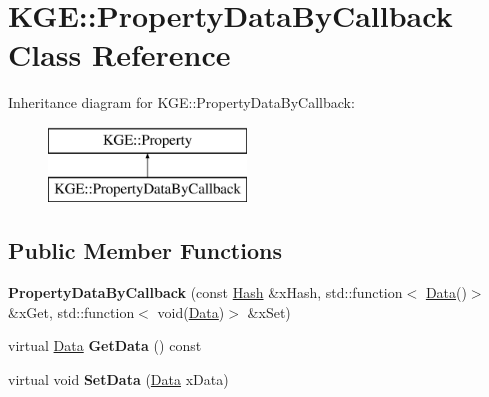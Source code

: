 \hypertarget{class_k_g_e_1_1_property_data_by_callback}{\section{K\-G\-E\-:\-:Property\-Data\-By\-Callback Class Reference}
\label{class_k_g_e_1_1_property_data_by_callback}
}
Inheritance diagram for K\-G\-E\-:\-:Property\-Data\-By\-Callback\-:\begin{figure}[H]
\begin{center}
\leavevmode
\includegraphics[height=2.000000cm]{class_k_g_e_1_1_property_data_by_callback}
\end{center}
\end{figure}
\subsection*{Public Member Functions}
\begin{DoxyCompactItemize}
\item 
\hypertarget{class_k_g_e_1_1_property_data_by_callback_a25300584870b77c3bd9fd7f4aa40358b}{{\bfseries Property\-Data\-By\-Callback} (const \hyperlink{class_k_g_e_1_1_hash}{Hash} \&x\-Hash, std\-::function$<$ \hyperlink{class_k_g_e_1_1_data}{Data}()$>$ \&x\-Get, std\-::function$<$ void(\hyperlink{class_k_g_e_1_1_data}{Data})$>$ \&x\-Set)}\label{class_k_g_e_1_1_property_data_by_callback_a25300584870b77c3bd9fd7f4aa40358b}

\item 
\hypertarget{class_k_g_e_1_1_property_data_by_callback_a4daa944a2121fc1ded5c7cee3006534a}{virtual \hyperlink{class_k_g_e_1_1_data}{Data} {\bfseries Get\-Data} () const }\label{class_k_g_e_1_1_property_data_by_callback_a4daa944a2121fc1ded5c7cee3006534a}

\item 
\hypertarget{class_k_g_e_1_1_property_data_by_callback_a7715f22f34f420601214d764e60f3c4a}{virtual void {\bfseries Set\-Data} (\hyperlink{class_k_g_e_1_1_data}{Data} x\-Data)}\label{class_k_g_e_1_1_property_data_by_callback_a7715f22f34f420601214d764e60f3c4a}

\end{DoxyCompactItemize}
